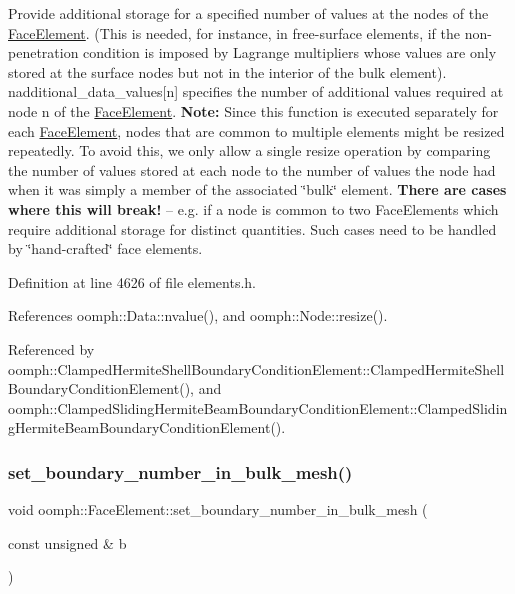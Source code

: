 Provide additional storage for a specified number of values at the nodes of the \hyperlink{classoomph_1_1FaceElement}{Face\+Element}. (This is needed, for instance, in free-\/surface elements, if the non-\/penetration condition is imposed by Lagrange multipliers whose values are only stored at the surface nodes but not in the interior of the bulk element). {\ttfamily nadditional\+\_\+data\+\_\+values}\mbox{[}n\mbox{]} specifies the number of additional values required at node {\ttfamily n} of the \hyperlink{classoomph_1_1FaceElement}{Face\+Element}. {\bfseries Note\+:} Since this function is executed separately for each \hyperlink{classoomph_1_1FaceElement}{Face\+Element}, nodes that are common to multiple elements might be resized repeatedly. To avoid this, we only allow a single resize operation by comparing the number of values stored at each node to the number of values the node had when it was simply a member of the associated \char`\"{}bulk\char`\"{} element. {\bfseries There are cases where this will break!} -- e.\+g. if a node is common to two Face\+Elements which require additional storage for distinct quantities. Such cases need to be handled by \char`\"{}hand-\/crafted\char`\"{} face elements. 



Definition at line 4626 of file elements.\+h.



References oomph\+::\+Data\+::nvalue(), and oomph\+::\+Node\+::resize().



Referenced by oomph\+::\+Clamped\+Hermite\+Shell\+Boundary\+Condition\+Element\+::\+Clamped\+Hermite\+Shell\+Boundary\+Condition\+Element(), and oomph\+::\+Clamped\+Sliding\+Hermite\+Beam\+Boundary\+Condition\+Element\+::\+Clamped\+Sliding\+Hermite\+Beam\+Boundary\+Condition\+Element().

\mbox{\label{classoomph_1_1FaceElement_aaaa03a7db357facfbcfc480d8e0db404}} 
\subsubsection{\texorpdfstring{set\+\_\+boundary\+\_\+number\+\_\+in\+\_\+bulk\+\_\+mesh()}{set\_boundary\_number\_in\_bulk\_mesh()}}
{\footnotesize\ttfamily void oomph\+::\+Face\+Element\+::set\+\_\+boundary\+\_\+number\+\_\+in\+\_\+bulk\+\_\+mesh (\begin{DoxyParamCaption}\item[{const unsigned \&}]{b }\end{DoxyParamCaption})\hspace{0.3cm}{\ttfamily [inline]}}



